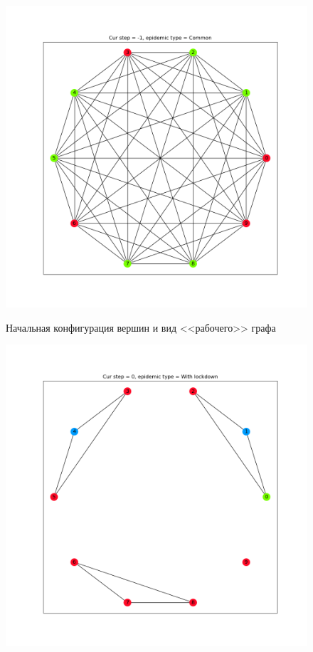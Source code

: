 	\begin{figure}[h]
		\begin{center}
			\begin{minipage}{0.49\linewidth}
			\includegraphics[width=\linewidth, keepaspectratio]{../figs/evidence2/init}
			
			\centering
			Начальная конфигурация вершин и вид <<рабочего>> графа
		\end{minipage}
		\begin{minipage}{0.49\linewidth}
			\includegraphics[width=\linewidth, keepaspectratio]{../figs/evidence2/start_with_ld}
			

\end{minipage}
\end{center}
\end{figure}

